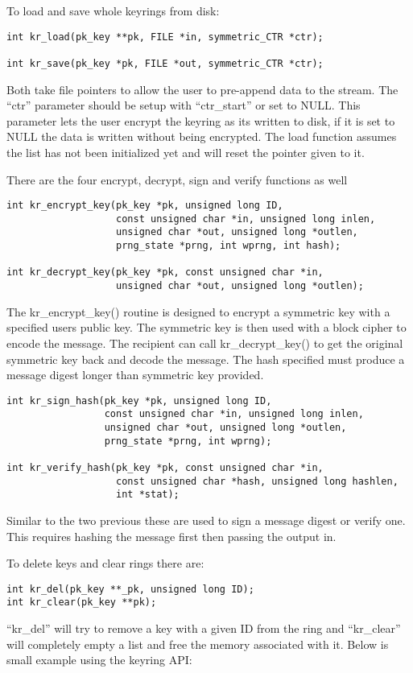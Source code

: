 \documentclass{book}
\begin{document}
To load and save whole keyrings from disk:
\begin{verbatim}
int kr_load(pk_key **pk, FILE *in, symmetric_CTR *ctr);

int kr_save(pk_key *pk, FILE *out, symmetric_CTR *ctr);
\end{verbatim}
Both take file pointers to allow the user to pre-append data to the stream.  The ``ctr'' parameter should be setup with 
``ctr\_start'' or set to NULL.  This parameter lets the user encrypt the keyring as its written to disk, if it is set
to NULL the data is written without being encrypted.  The load function assumes the list has not been initialized yet 
and will reset the pointer given to it.

There are the four encrypt, decrypt, sign and verify functions as well
\begin{verbatim}
int kr_encrypt_key(pk_key *pk, unsigned long ID, 
                   const unsigned char *in, unsigned long inlen,
                   unsigned char *out, unsigned long *outlen,
                   prng_state *prng, int wprng, int hash);

int kr_decrypt_key(pk_key *pk, const unsigned char *in,
                   unsigned char *out, unsigned long *outlen);
\end{verbatim}

The kr\_encrypt\_key() routine is designed to encrypt a symmetric key with a specified users public key.  The symmetric
key is then used with a block cipher to encode the message.  The recipient can call kr\_decrypt\_key() to get the original
symmetric key back and decode the message.  The hash specified must produce a message digest longer than symmetric key 
provided.  

\begin{verbatim}
int kr_sign_hash(pk_key *pk, unsigned long ID, 
                 const unsigned char *in, unsigned long inlen,
                 unsigned char *out, unsigned long *outlen,
                 prng_state *prng, int wprng);

int kr_verify_hash(pk_key *pk, const unsigned char *in, 
                   const unsigned char *hash, unsigned long hashlen,
                   int *stat);
\end{verbatim}

Similar to the two previous these are used to sign a message digest or verify one.  This requires hashing the message
first then passing the output in. 

To delete keys and clear rings there are:
\begin{verbatim}
int kr_del(pk_key **_pk, unsigned long ID);
int kr_clear(pk_key **pk);
\end{verbatim}
``kr\_del'' will try to remove a key with a given ID from the ring and ``kr\_clear'' will completely empty a list and free
the memory associated with it.  Below is small example using the keyring API:
\end{document}
